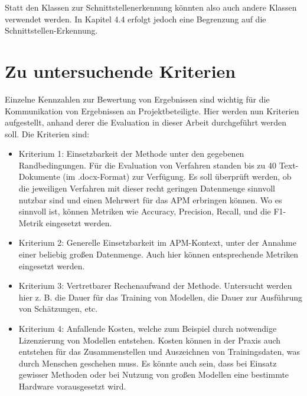 Statt den Klassen zur Schnittstellenerkennung könnten also auch andere Klassen verwendet werden. In Kapitel 4.4 erfolgt jedoch eine Begrenzung auf die Schnittstellen-Erkennung.

\section{Zu untersuchende Kriterien}

Einzelne Kennzahlen zur Bewertung von Ergebnissen sind wichtig für die Kommunikation von Ergebnissen an Projektbeteiligte. Hier werden nun Kriterien aufgestellt, anhand derer die Evaluation in dieser Arbeit durchgeführt werden soll. Die Kriterien sind:

\begin{itemize}
  \item Kriterium 1: Einsetzbarkeit der Methode unter den gegebenen Randbedingungen. Für die Evaluation von Verfahren standen bis zu 40 Text-Dokumente (im .docx-Format) zur Verfügung. Es soll überprüft werden, ob die jeweiligen Verfahren mit dieser recht geringen Datenmenge sinnvoll nutzbar sind und einen Mehrwert für das APM erbringen können. Wo es sinnvoll ist, können Metriken wie Accuracy, Precision, Recall, und die F1-Metrik eingesetzt werden.
  \item Kriterium 2: Generelle Einsetzbarkeit im APM-Kontext, unter der Annahme einer beliebig großen Datenmenge. Auch hier können entsprechende Metriken eingesetzt werden. 
  \item Kriterium 3: Vertretbarer Rechenaufwand der Methode. Untersucht werden hier z. B. die Dauer für das Training von Modellen, die Dauer zur Ausführung von Schätzungen, etc.
  \item 
Kriterium 4: Anfallende Kosten, welche zum Beispiel durch notwendige Lizenzierung von Modellen entstehen. Kosten können in der Praxis auch entstehen für das Zusammenstellen und Auszeichnen von Trainingsdaten, was durch Menschen geschehen muss. Es könnte auch sein, dass bei Einsatz gewisser Methoden oder bei Nutzung von großen Modellen eine bestimmte Hardware vorausgesetzt wird. 
\end{itemize}


